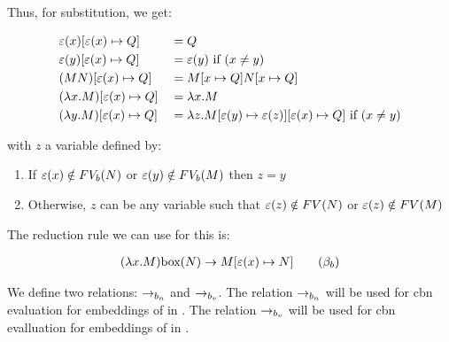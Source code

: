 Thus, for substitution, we get:

\[
\begin{aligned}
	& \varepsilon(x) [{\varepsilon(x)}\mapsto{Q}]            & &= Q \\
	& \varepsilon(y)  [{\varepsilon(x)}\mapsto{Q}]           & &= \varepsilon(y) \text{ if } (x \neq y)\\
	& (M N) [{\varepsilon(x)}\mapsto{Q}]               & &= M [{x}\mapsto{Q}] N [{x}\mapsto{Q}] \\
	& (\lambda {x}.{M}) [{\varepsilon(x)}\mapsto{Q}]       & &= \lambda {x}.{M} \\
	& (\lambda {y}.{M}) [{\varepsilon(x)}\mapsto{Q}]       & &= \lambda {z}.{M [{\varepsilon(y)}\mapsto{\varepsilon(z)}][{\varepsilon(x)}\mapsto{Q}]} \text{ if } (x \neq y) \\
\end{aligned}
\]

with $z$ a variable defined by:
\begin{enumerate}
	\item%
	If $\varepsilon(x) \notin FV_b(N)$ or $\varepsilon(y) \notin FV_b(M)$ then $z = y$
	\item%
	Otherwise, $z$ can be any variable such that $\varepsilon(z) \notin FV(N)$ or $\varepsilon(z) \notin FV(M)$
\end{enumerate}

The reduction rule we can use for this \lc is:

\begin{align*}
  (\lambda {x}.{M})\text{box}({N}) \to M [{\varepsilon(x)}\mapsto{N}] \quad \quad (\beta_b)
\end{align*}

We define two relations: $\to_{b_n}$ and $\to_{b_v}$. The relation $\to_{b_n}$ will be used for cbn evaluation for embeddings of \lan in \lab.
The relation $\to_{b_v}$ will be used for cbn evalluation for embeddings of \lav in \lab. 

